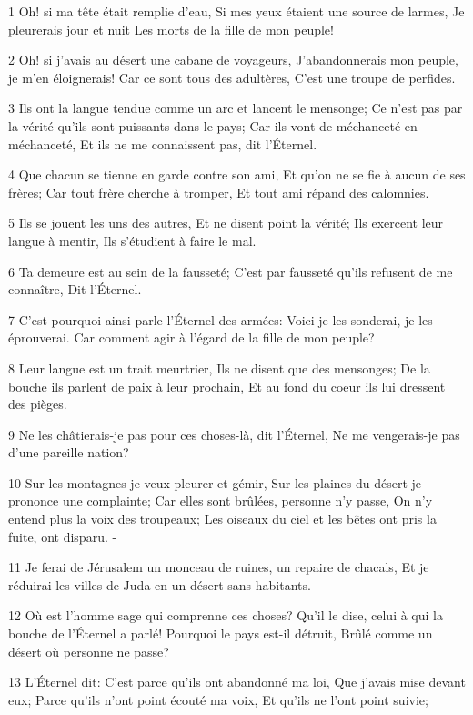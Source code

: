 \par 1 Oh! si ma tête était remplie d'eau, Si mes yeux étaient une source de larmes, Je pleurerais jour et nuit Les morts de la fille de mon peuple!
\par 2 Oh! si j'avais au désert une cabane de voyageurs, J'abandonnerais mon peuple, je m'en éloignerais! Car ce sont tous des adultères, C'est une troupe de perfides.
\par 3 Ils ont la langue tendue comme un arc et lancent le mensonge; Ce n'est pas par la vérité qu'ils sont puissants dans le pays; Car ils vont de méchanceté en méchanceté, Et ils ne me connaissent pas, dit l'Éternel.
\par 4 Que chacun se tienne en garde contre son ami, Et qu'on ne se fie à aucun de ses frères; Car tout frère cherche à tromper, Et tout ami répand des calomnies.
\par 5 Ils se jouent les uns des autres, Et ne disent point la vérité; Ils exercent leur langue à mentir, Ils s'étudient à faire le mal.
\par 6 Ta demeure est au sein de la fausseté; C'est par fausseté qu'ils refusent de me connaître, Dit l'Éternel.
\par 7 C'est pourquoi ainsi parle l'Éternel des armées: Voici je les sonderai, je les éprouverai. Car comment agir à l'égard de la fille de mon peuple?
\par 8 Leur langue est un trait meurtrier, Ils ne disent que des mensonges; De la bouche ils parlent de paix à leur prochain, Et au fond du coeur ils lui dressent des pièges.
\par 9 Ne les châtierais-je pas pour ces choses-là, dit l'Éternel, Ne me vengerais-je pas d'une pareille nation?
\par 10 Sur les montagnes je veux pleurer et gémir, Sur les plaines du désert je prononce une complainte; Car elles sont brûlées, personne n'y passe, On n'y entend plus la voix des troupeaux; Les oiseaux du ciel et les bêtes ont pris la fuite, ont disparu. -
\par 11 Je ferai de Jérusalem un monceau de ruines, un repaire de chacals, Et je réduirai les villes de Juda en un désert sans habitants. -
\par 12 Où est l'homme sage qui comprenne ces choses? Qu'il le dise, celui à qui la bouche de l'Éternel a parlé! Pourquoi le pays est-il détruit, Brûlé comme un désert où personne ne passe?
\par 13 L'Éternel dit: C'est parce qu'ils ont abandonné ma loi, Que j'avais mise devant eux; Parce qu'ils n'ont point écouté ma voix, Et qu'ils ne l'ont point suivie;
